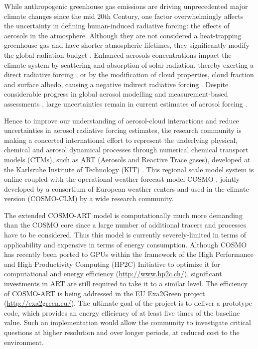 While anthropogenic greenhouse gas emissions are driving unprecedented
major  climate  changes  since   the  mid  20th  Century,  one  factor
overwhelmingly  affects  the  uncertainty  in  defining  human-induced
radiative  forcing:  the  effects   of  aerosols  in  the  atmosphere.
Although they  are not considered  a heat-trapping greenhouse  gas and
have  shorter  atmospheric lifetimes,  they  significantly modify  the
global   radiation   budget   \citep{IPCC-2013}.   Enhanced   aerosols
concentrations impact the climate  system by scattering and absorption
of   solar   radiation,    thereby   exerting   a   direct   radiative
forcing  \citep{Liao-2005,  Bangert-2012,  Lundgren-2013}, or  by  the
modification of  cloud properties, cloud fraction  and surface albedo,
causing  a negative  indirect  radiative forcing  \citep{Haywood-2000,
Lohmann-2005,     VandenHeever-2011,     Rosenfeld-2013}.      Despite
considerable  progress in  global aerosol  modelling \citep{Mann-2013}
and    measurement-based    assessments   \citep{Myhre-2009},    large
uncertainties    remain    in    current    estimates    of    aerosol
forcing   \citep{Myhre-2013,    IPCC-2013,   Lee-2013,   Randles-2013,
Rosenfeld-2013, Sherwood-2013, Stier-2013}.

Hence to  improve our understanding of  aerosol-cloud interactions and
reduce  uncertainties  in  aerosol  radiative forcing  estimates,  the
research  community  is making  a  concerted  international effort  to
represent  the  underlying physical,  chemical  and aerosol  dynamical
processes through numerical chemical  transport models (CTMs), such as
ART (Aerosols  and Reactive Trace  gases), developed at  the Karlsruhe
Institute   of  Technology   (KIT)   \citep{Vogel-2009,  Bangert-2011,
Knote-2013}. This  regional scale model system is  online coupled with
the  operational weather  forecast  model COSMO  \citep{Baldauf-2011},
jointly developed by a consortium of European weather centers and used
in the climate version (COSMO-CLM)  by a wide research community.  

The extended  COSMO-ART model  is computationally much  more demanding
than the  COSMO core  since a large  number of additional  tracers and
processes  have  to  be  considered.   Thus this  model  is  currently
severely-limited in  terms of applicability and expensive  in terms of
energy consumption.   Although COSMO has recently been  ported to GPUs
within  the framework of  the High  Performance and  High Productivity
Computing  (HP2C)  Initiative to  optimize  it  for computational  and
energy efficiency (\url{http://www.hp2c.ch/}), significant investments
in  ART  are still  required  to  take it  to  a  similar level.   The
efficiency of COSMO-ART is being addressed in the EU Exa2Green project
(\url{http://exa2green.eu/}). The  ultimate goal of the  project is to
deliver a  prototype code, which  provides an energy efficiency  of at
least five times of the  baseline value.  Such an implementation would
allow  the  community  to  investigate critical  questions  at  higher
resolution  and   over  longer  periods,   at  reduced  cost   to  the
environment.

